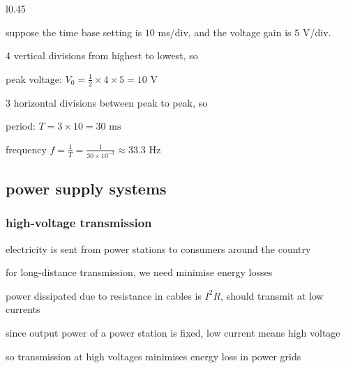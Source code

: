 \label{ex-readcro}

\begin{wrapfigure}{l}{0.45\linewidth}
\centering
{}
\end{wrapfigure}

suppose the time base setting is $10$ ms/div, and the voltage gain is $5$ V/div.
 
4 vertical divisions from highest to lowest, so

\eqskip peak voltage: $V_0= \frac{1}{2} \times 4 \times 5 = 10 \text{ V}$

3 horizontal divisions between peak to peak, so

\eqskip period: $T = 3 \times 10 = 30 \text{ ms}$
	
\eqskip frequency $f = \frac{1}{T} = \frac{1}{30\times10^{-3}} \approx 33.3 \text{ Hz} $ \eoe






\subsection{power supply systems}

\subsubsection{high-voltage transmission}

electricity is sent from power stations to consumers around the country

for long-distance transmission, we need minimise energy losses 

power dissipated due to resistance in cables is $I^2 R$, should transmit at low currents

since output power of a power station is fixed, low current means high voltage

so transmission at high voltages minimises energy loss in power grids

